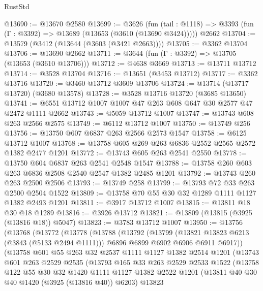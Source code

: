 \begin{lexlean}{RustStd}
\begin{coremodule}
@13690 := @13670 @2580
@13699 := @3626
    (fun (tail : @1118) => @3393 (fun (Γ : @3392) => @13689 (@13653 (@3610 (@13690 @3424)))))
    @2662
@13704 := @13579 (@3412 (@13644 (@3603 (@3421 @2663))))
@13705 := @3362 @13704
@13706 := @13690 @2662
@13711 := @3644 (fun (Γ : @3392) => @13705 (@13653 (@3610 @13706)))
@13712 := @4638 @3669
@13713 := @13711 @13712
@13714 := @3528 @13704
@13716 := @13651 (@3453 @13712)
@13717 := @3362 @13716
@13720 := @3460 @13712 @3609 @13706
@13724 := @13714 (@13717 @13720) (@3680 @13578)
@13728 := @3528 @13716 @13720 (@3685 @13650)
@13741 := @6551 @13712 @1007 @1007 @47 @263 @608 @647 @30 @2577 @47 @2472 @1111 @2662
@13743 := @5059 @13712 @1007
@13747 := @13743 @608 @263 @2566 @2575
@13749 := @6112 @13712 @1007
@13750 := @13749 @256
@13756 := @13750 @607 @6837 @263 @2566 @2573 @1547
@13758 := @6125 @13712 @1007
@13768 := @13758 @605 @269 @263 @6836 @2552 @2565 @2572 @1382 @2477 @1201
@13772 := @13743 @605 @263 @2541 @2550
@13778 := @13750 @604 @6837 @263 @2541 @2548 @1547
@13788 := @13758 @260 @603 @263 @6836 @2508 @2540 @2547 @1382 @2485 @1201
@13792 := @13743 @260 @263 @2500 @2506
@13793 := @13749 @258
@13799 := @13793 @72 @33 @263 @2500 @2504 @1522
@13809 := @13758 @70 @55 @30 @32 @1289 @1111 @1127 @1382 @2493 @1201
@13811 := @3917 @13712 @1007
@13815 := @13811 @18 @30 @18 @1289
@13816 := @3926 @13712
@13821 := @13809 (@13815 (@3925 (@13816 @18)) @5047)
@13823 := @3783 @13712 @1007
@13950 := @13756
    (@13768
      (@13772
        (@13778
          (@13788
            (@13792
              (@13799
                (@13821 @13823 @6213 (@3843 (@5133 @2494 @1111)))
                @6896
                @6899
                @6902
                @6906
                @6911
                @6917))
            (@13758
              @601
              @55
              @263
              @32
              @2537
              @1111
              @1127
              @1382
              @2514
              @1201
              (@13743
                @601
                @263
                @2529
                @2535
                (@13793
                  @165
                  @33
                  @263
                  @2529
                  @2533
                  @1522
                  (@13758
                    @122
                    @55
                    @30
                    @32
                    @1420
                    @1111
                    @1127
                    @1382
                    @2522
                    @1201
                    (@13811 @40 @30 @40 @1420 (@3925 (@13816 @40)) @6203)
                    @13823

\end{coremodule}
\end{lexlean}

